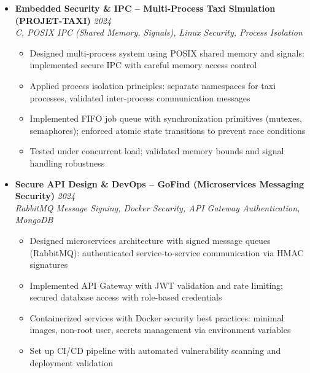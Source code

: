\documentclass[a4paper,11pt]{article}
\begin{document}
\begin{itemize}[leftmargin=*, label={-}]
\item \textbf{Embedded Security \& IPC -- Multi-Process Taxi Simulation (PROJET-TAXI)} \hfill \textit{2024} \\
\textit{C, POSIX IPC (Shared Memory, Signals), Linux Security, Process Isolation} \vspace{-2pt}
    \begin{itemize}[leftmargin=0.4cm, nosep, label=\tiny$\bullet$]
        \item Designed multi-process system using POSIX shared memory and signals: implemented secure IPC with careful memory access control
        \item Applied process isolation principles: separate namespaces for taxi processes, validated inter-process communication messages
        \item Implemented FIFO job queue with synchronization primitives (mutexes, semaphores); enforced atomic state transitions to prevent race conditions
        \item Tested under concurrent load; validated memory bounds and signal handling robustness
    \end{itemize}

\item \textbf{Secure API Design \& DevOps -- GoFind (Microservices Messaging Security)} \hfill \textit{2024} \\
\textit{RabbitMQ Message Signing, Docker Security, API Gateway Authentication, MongoDB} \vspace{-2pt}
    \begin{itemize}[leftmargin=0.4cm, nosep, label=\tiny$\bullet$]
        \item Designed microservices architecture with signed message queues (RabbitMQ): authenticated service-to-service communication via HMAC signatures
        \item Implemented API Gateway with JWT validation and rate limiting; secured database access with role-based credentials
        \item Containerized services with Docker security best practices: minimal images, non-root user, secrets management via environment variables
        \item Set up CI/CD pipeline with automated vulnerability scanning and deployment validation
    \end{itemize}

\end{itemize}

\vspace{4pt}
\end{document}
